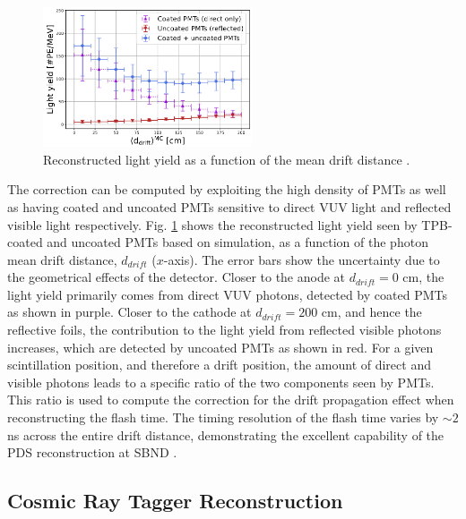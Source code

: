 \begin{figure}[b!]
\centering    
\includegraphics[width=0.55\textwidth]{light_yield_sim}
\caption[Reconstructed Light Yield at SBND]{
Reconstructed light yield as a function of the mean drift distance \cite{sbnd_pds_paper}. 
}
\label{fig:light_yield_Diego}
\end{figure}

The correction can be computed by exploiting the high density of PMTs as well as having coated and uncoated PMTs sensitive to direct VUV light and reflected visible light respectively.
Fig. \ref{fig:light_yield_Diego} shows the reconstructed light yield seen by TPB-coated and uncoated PMTs based on simulation, as a function of the photon mean drift distance, $d_{drift}$ ($x$-axis).
The error bars show the uncertainty due to the geometrical effects of the detector.
Closer to the anode at $d_{drift} = 0 $ cm, the light yield primarily comes from direct VUV photons, detected by coated PMTs as shown in purple.
Closer to the cathode at $d_{drift} = 200 $ cm, and hence the reflective foils, the contribution to the light yield from reflected visible photons increases, which are detected by uncoated PMTs as shown in red.
For a given scintillation position, and therefore a drift position, the amount of direct and visible photons leads to a specific ratio of the two components seen by PMTs.
This ratio is used to compute the correction for the drift propagation effect when reconstructing the flash time.                                                                              
The timing resolution of the flash time varies by $\sim 2$ ns across the entire drift distance, demonstrating the excellent capability of the PDS reconstruction at SBND \cite{sbnd_pds_paper}.

\subsection{Cosmic Ray Tagger Reconstruction}
\label{sec:crt_reco}

